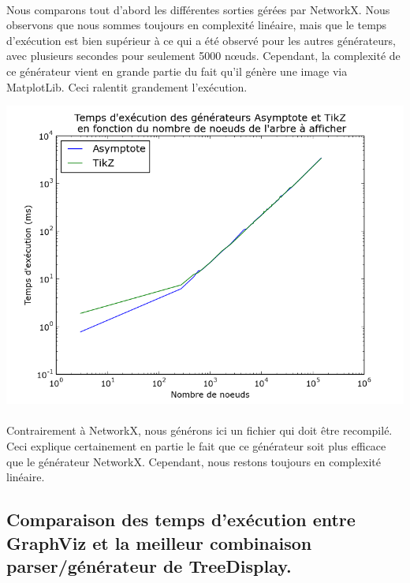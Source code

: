 \paragraph{} Nous comparons tout d'abord les différentes sorties gérées par NetworkX. Nous observons que nous sommes toujours en complexité linéaire, mais que le temps d'exécution est bien supérieur à ce qui a été observé pour les autres générateurs, avec plusieurs secondes pour seulement 5000 n\oe uds. Cependant, la complexité de ce générateur vient en grande partie du fait qu'il génère une image via MatplotLib. Ceci ralentit grandement l'exécution.
	
\begin{center}

\includegraphics[width=\columnwidth]{execTimeGenerators}

\end{center}

\paragraph{} Contrairement à NetworkX, nous générons ici un fichier qui doit être recompilé. Ceci explique certainement en partie le fait que ce générateur soit plus efficace que le générateur NetworkX. Cependant, nous restons toujours en complexité linéaire.

	\subsection{Comparaison des temps d'exécution entre GraphViz et la meilleur combinaison parser/générateur de TreeDisplay.}
	
